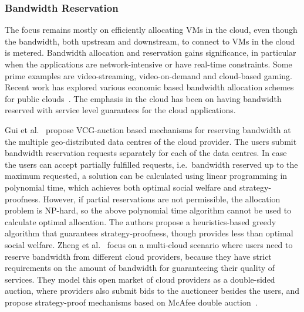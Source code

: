 
\subsubsection{Bandwidth Reservation}
\label{sec__related_work_cloud_bandwidth}

The focus remains mostly on efficiently allocating VMs in the cloud, 
even though the bandwidth, both upstream and downstream, to connect to VMs in the cloud is metered.
Bandwidth allocation and reservation gains significance, 
in particular when the applications are network-intensive or have real-time constraints.
Some prime examples are video-streaming, video-on-demand and cloud-based gaming. 
Recent work has explored various economic based bandwidth allocation
schemes for public clouds~\cite{Gui2014Soar, Guo2013, Niu2012, Popa2012, Shen2014NewBandwidth, Zheng2014Star}.
The emphasis in the cloud has been on having bandwidth reserved with service level guarantees for the cloud applications.

Gui et al.~\cite{Gui2014Soar} propose VCG-auction based mechanisms for reserving bandwidth 
at the multiple geo-distributed data centres of the cloud provider. 
The users submit bandwidth reservation requests separately for each of the data centres.
In case the users can accept partially fulfilled requests, 
i.e.~bandwidth reserved up to the maximum requested, 
a solution can be calculated using linear programming in polynomial time,
which achieves both optimal social welfare and strategy-proofness.
However, if partial reservations are not permissible, 
the allocation problem is NP-hard, so the above polynomial time algorithm
cannot be used to calculate optimal allocation. 
The authors propose a heuristics-based greedy algorithm that guarantees strategy-proofness,
though provides less than optimal social welfare.
%
Zheng et al.~\cite{Zheng2014Star} focus on a multi-cloud scenario where 
users need to reserve bandwidth from different cloud providers, 
because they have strict requirements on the amount of bandwidth for guaranteeing their quality of services. 
They model this open market of cloud providers as a double-sided auction, 
where providers also submit bids to the auctioneer besides the users,
and propose strategy-proof mechanisms based on McAfee double auction~\cite{Myerson1983}.

